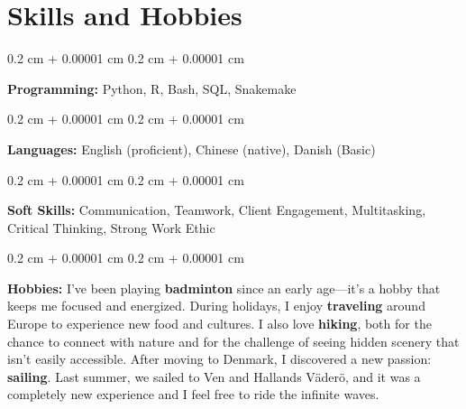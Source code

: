 \documentclass[10pt, letterpaper]{article}
\newenvironment{onecolentry}{
    \begin{adjustwidth}{
        0.2 cm + 0.00001 cm
    }{
        0.2 cm + 0.00001 cm
    }
}{
    \end{adjustwidth}
} %
\begin{document}
    
    \section{Skills and Hobbies}

        \begin{onecolentry}
            \textbf{Programming:} Python, R, Bash, SQL, Snakemake
        \end{onecolentry}

        \vspace{0.2 cm}

        \begin{onecolentry}
            \textbf{Languages:} English (proficient), Chinese (native), Danish (Basic)
        \end{onecolentry}

        \vspace{0.2 cm}

        \begin{onecolentry}
            \textbf{Soft Skills:} Communication, Teamwork, Client Engagement, Multitasking, Critical Thinking, Strong Work Ethic
        \end{onecolentry}

        \vspace{0.2 cm}

        \begin{onecolentry}
            \textbf{Hobbies:} 
            I’ve been playing \textbf{badminton} since an early age—it’s a hobby that keeps me focused and energized. During holidays, I enjoy \textbf{traveling} around Europe to experience new food and cultures. I also love \textbf{hiking}, both for the chance to connect with nature and for the challenge of seeing hidden scenery that isn’t easily accessible. After moving to Denmark, I discovered a new passion: \textbf{sailing}. Last summer, we sailed to Ven and Hallands Väderö, and it was a completely new experience and  I feel free to ride the infinite waves.
        \end{onecolentry}


    
\end{document}
